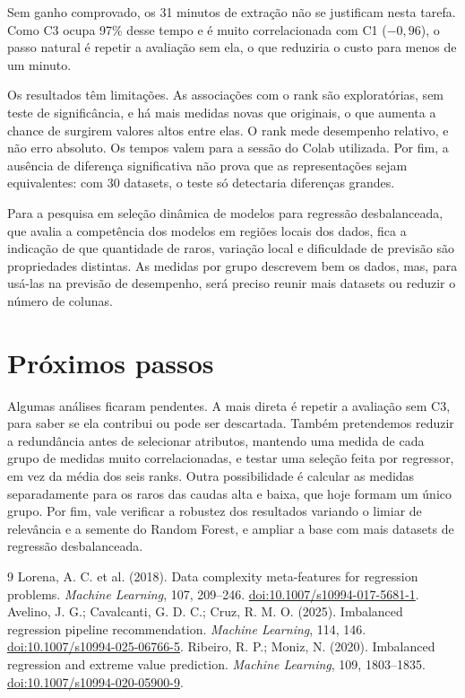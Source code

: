 \documentclass[10pt,a4paper]{article}
\begin{document}
Sem ganho comprovado, os 31 minutos de extração não se justificam nesta tarefa. Como C3 ocupa 97\% desse tempo e é muito correlacionada com C1 ($-0{,}96$), o passo natural é repetir a avaliação sem ela, o que reduziria o custo para menos de um minuto.

Os resultados têm limitações. As associações com o rank são exploratórias, sem teste de significância, e há mais medidas novas que originais, o que aumenta a chance de surgirem valores altos entre elas. O rank mede desempenho relativo, e não erro absoluto. Os tempos valem para a sessão do Colab utilizada. Por fim, a ausência de diferença significativa não prova que as representações sejam equivalentes: com 30 datasets, o teste só detectaria diferenças grandes.

Para a pesquisa em seleção dinâmica de modelos para regressão desbalanceada, que avalia a competência dos modelos em regiões locais dos dados, fica a indicação de que quantidade de raros, variação local e dificuldade de previsão são propriedades distintas. As medidas por grupo descrevem bem os dados, mas, para usá-las na previsão de desempenho, será preciso reunir mais datasets ou reduzir o número de colunas.

\section{Próximos passos}

Algumas análises ficaram pendentes. A mais direta é repetir a avaliação sem C3, para saber se ela contribui ou pode ser descartada. Também pretendemos reduzir a redundância antes de selecionar atributos, mantendo uma medida de cada grupo de medidas muito correlacionadas, e testar uma seleção feita por regressor, em vez da média dos seis ranks. Outra possibilidade é calcular as medidas separadamente para os raros das caudas alta e baixa, que hoje formam um único grupo. Por fim, vale verificar a robustez dos resultados variando o limiar de relevância e a semente do Random Forest, e ampliar a base com mais datasets de regressão desbalanceada.

\begingroup
\footnotesize
\begin{thebibliography}{9}
\setlength{\itemsep}{0pt}
 Lorena, A. C. et al. (2018). Data complexity meta-features for regression problems. \emph{Machine Learning}, 107, 209--246. \href{https://doi.org/10.1007/s10994-017-5681-1}{doi:10.1007/s10994-017-5681-1}.
 Avelino, J. G.; Cavalcanti, G. D. C.; Cruz, R. M. O. (2025). Imbalanced regression pipeline recommendation. \emph{Machine Learning}, 114, 146. \href{https://doi.org/10.1007/s10994-025-06766-5}{doi:10.1007/s10994-025-06766-5}.
 Ribeiro, R. P.; Moniz, N. (2020). Imbalanced regression and extreme value prediction. \emph{Machine Learning}, 109, 1803--1835. \href{https://doi.org/10.1007/s10994-020-05900-9}{doi:10.1007/s10994-020-05900-9}.
\end{thebibliography}
\endgroup
\end{document}
